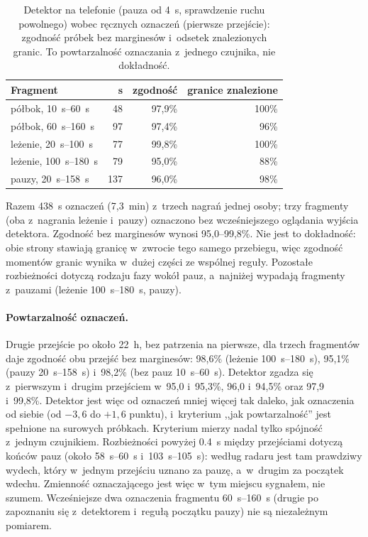 \documentclass[12pt,a4paper,oneside]{report}
\begin{document}
\begin{table}[H]
\centering
\small
\caption{Detektor na telefonie (pauza od \SI{4}{s}, sprawdzenie ruchu powolnego) wobec ręcznych oznaczeń
(pierwsze przejście): zgodność próbek bez marginesów i~odsetek znalezionych granic. To powtarzalność oznaczania z~jednego czujnika, nie dokładność.}
\label{tab:fazy-reczne}
\begin{tabular}{lrrr}
\toprule
Fragment & s & zgodność & granice znalezione \\
\midrule
półbok, \SIrange{10}{60}{s} & 48 & 97,9\% & 100\% \\
półbok, \SIrange{60}{160}{s} & 97 & 97,4\% & 96\% \\
leżenie, \SIrange{20}{100}{s} & 77 & 99,8\% & 100\% \\
leżenie, \SIrange{100}{180}{s} & 79 & 95,0\% & 88\% \\
pauzy, \SIrange{20}{158}{s} & 137 & 96,0\% & 98\% \\
\bottomrule
\end{tabular}
\end{table}

Razem 438~s oznaczeń (7,3~min) z~trzech nagrań jednej osoby; trzy fragmenty (oba z~nagrania leżenie
i~pauzy) oznaczono bez wcześniejszego oglądania wyjścia detektora. Zgodność bez marginesów wynosi
95,0--99,8\%. Nie jest to dokładność: obie
strony stawiają granicę w~zwrocie tego samego przebiegu, więc zgodność momentów granic wynika w~dużej
części ze wspólnej reguły. Pozostałe rozbieżności dotyczą rodzaju fazy wokół pauz, a~najniżej wypadają
fragmenty z~pauzami (leżenie \SIrange{100}{180}{s}, pauzy).

\paragraph{Powtarzalność oznaczeń.} Drugie przejście po około \SI{22}{h}, bez patrzenia na pierwsze, dla
trzech fragmentów daje zgodność obu przejść bez marginesów: 98,6\% (leżenie \SIrange{100}{180}{s}),
95,1\% (pauzy \SIrange{20}{158}{s}) i~98,2\% (bez pauz \SIrange{10}{60}{s}). Detektor zgadza się
z~pierwszym i~drugim przejściem w~95,0 i~95,3\%, 96,0 i~94,5\% oraz 97,9 i~99,8\%. Detektor jest więc
od oznaczeń mniej więcej tak daleko, jak oznaczenia od siebie (od $-3{,}6$ do $+1{,}6$ punktu), i~kryterium
,,jak powtarzalność'' jest spełnione na surowych próbkach. Kryterium mierzy nadal tylko spójność z~jednym
czujnikiem.
Rozbieżności powyżej \SI{0.4}{s} między przejściami dotyczą końców pauz (około \SI{58}{s}--\SI{60}{s}
i~\SI{103}{s}--\SI{105}{s}): według radaru jest tam prawdziwy wydech, który w~jednym przejściu uznano za
pauzę, a~w~drugim za początek wdechu. Zmienność oznaczającego jest więc w~tym miejscu sygnałem, nie szumem.
Wcześniejsze dwa oznaczenia fragmentu \SIrange{60}{160}{s} (drugie po zapoznaniu się z~detektorem
i~regułą początku pauzy) nie są niezależnym pomiarem.
\end{document}
